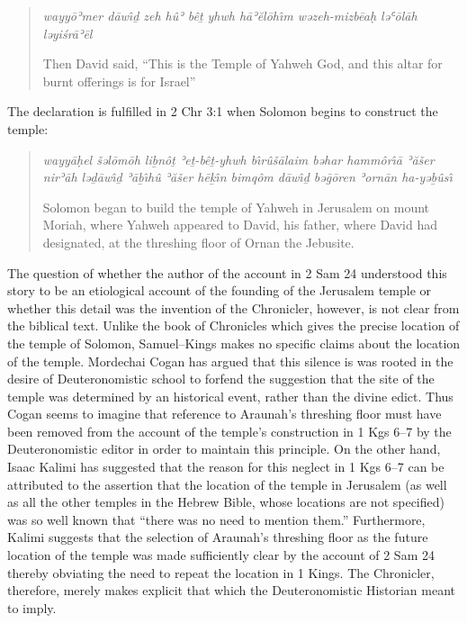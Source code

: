  \begin{quote} \emph{wayyōʾmer dāwı̂ḏ zeh hûʾ bêṯ yhwh hāʾĕlōhı̂m wəzeh-mizbēaḥ ləʿōlāh ləyiśrāʾēl} 

 Then David said, ``This is the Temple of Yahweh God, and this altar for burnt offerings is for Israel'' \end{quote} 

 The declaration is fulfilled in 2 Chr 3:1 when Solomon begins to construct the temple: 

 \begin{quote} \emph{wayyāḥel šəlōmōh liḇnôṯ ʾeṯ-bêṯ-yhwh bı̂rûšālaim bəhar hammôrı̂ā ʾăšer nirʾāh ləḏāwı̂ḏ ʾāḇı̂hû ʾăšer hēḵı̂n bimqôm dāwı̂ḏ bəḡōren ʾornān ha-yəḇûsı̂} 

 Solomon began to build the temple of Yahweh in Jerusalem on mount Moriah, where Yahweh appeared to David, his father, where David had designated, at the threshing floor of Ornan the Jebusite. \end{quote} 

 The question of whether the author of the account in 2 Sam 24 understood this story to be an etiological account of the founding of the Jerusalem temple or whether this detail was the invention of the Chronicler, however, is not clear from the biblical text. Unlike the book of Chronicles which gives the precise location of the temple of Solomon, Samuel--Kings makes no specific claims about the location of the temple. Mordechai Cogan has argued that this silence is was rooted in the desire of Deuteronomistic school to forfend the suggestion that the site of the temple was determined by an historical event, rather than the divine edict.\autocite[307]{cogan_tarbiz1986} Thus Cogan seems to imagine that reference to Araunah's threshing floor must have been removed from the account of the temple's construction in 1 Kgs 6--7 by the Deuteronomistic editor in order to maintain this principle.\autocite[307]{cogan_tarbiz1986} On the other hand, Isaac Kalimi has suggested that the reason for this neglect in 1 Kgs 6--7 can be attributed to the assertion that the location of the temple in Jerusalem (as well as all the other temples in the Hebrew Bible, whose locations are not specified) was so well known that ``there was no need to mention them.''\autocite[I would, however, make the observation that, depending on how one dates the account in 1 Kng 6--7, it may be the case that an \emph{exilic} author genuinely did not know the precise location of the temple. However, Kalimi also points out that other ANE temple building texts often neglect to specify the precise location of their subjects. On this point, I would also hasten to add that monumental inscriptions should be treated separately, since the location of the inscription, ostensibly, \emph{would be} the location of the temple.][355--356]{kalimi_htr1990} Furthermore, Kalimi suggests that the selection of Araunah's threshing floor as the future location of the temple was made sufficiently clear by the account of 2 Sam 24 thereby obviating the need to repeat the location in 1 Kings.\autocite[357]{kalimi_htr1990} The Chronicler, therefore, merely makes explicit that which the Deuteronomistic Historian meant to imply. 

